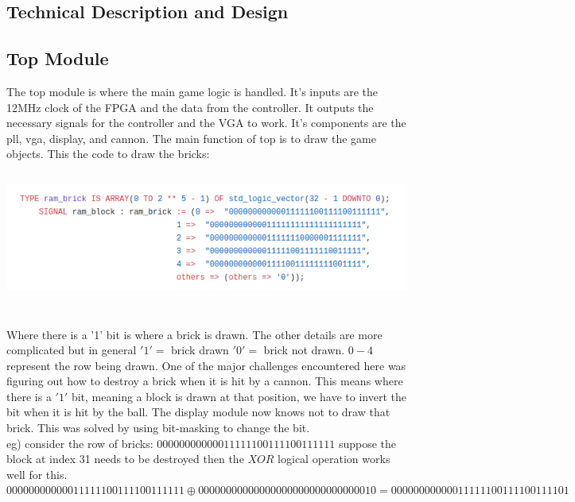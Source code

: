 \documentclass[12pt]{article}
\begin{document}
\begin{flushleft}
\section{Technical Description and Design}
\subsection{Top Module}

The top module is where the main game logic is handled. It's inputs are the
12MHz clock of the FPGA and the data from the controller. It outputs the
necessary signals for the controller and the VGA to work. It's components
are the pll, vga, display, and cannon. The main function of top is to draw the
game objects. This the code to draw the bricks:\\
\includegraphics[width=15cm, height=5cm]{drawingBricks}

Where there is a '1' bit is where a brick is drawn. The other details are more
complicated but in general $'1' = $ brick drawn $'0'=$ brick not drawn. $0 - 4$
represent the row being drawn. One of the major challenges encountered here was
figuring out how to destroy a brick when it is hit by a cannon. This means where
there is a $'1'$ bit, meaning a block is drawn at that position, we have to invert
the bit when it is hit by the ball. The display module now knows not to draw
that brick. This was solved by using bit-masking to change the bit.\\ 
eg) consider the row of bricks: $00000000000011111100111100111111$
suppose the block at index 31 needs to be destroyed then the $XOR$ logical
operation works well for this. 
$00000000000011111100111100111111 \oplus 00000000000000000000000000000010 =
00000000000011111100111100111101$ 


\end{flushleft}
\end{document}
